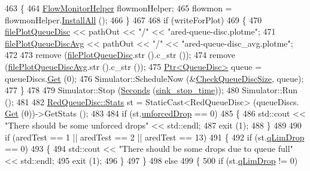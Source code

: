 \begin{DoxyCode}
463     \{
464       \hyperlink{classns3_1_1FlowMonitorHelper}{FlowMonitorHelper} flowmonHelper;
465       flowmon = flowmonHelper.\hyperlink{classns3_1_1FlowMonitorHelper_a722b383a10c5a959576f3bfee8d4374f}{InstallAll} ();
466     \}
467 
468   \textcolor{keywordflow}{if} (writeForPlot)
469     \{
470       \hyperlink{adaptive-red-tests_8cc_a06d9ff5c07ecb984ef94ad415abd87b5}{filePlotQueueDisc} << pathOut << \textcolor{stringliteral}{"/"} << \textcolor{stringliteral}{"ared-queue-disc.plotme"};
471       \hyperlink{adaptive-red-tests_8cc_a4164ee3b210acca3b1e1c45ad2bac980}{filePlotQueueDiscAvg} << pathOut << \textcolor{stringliteral}{"/"} << \textcolor{stringliteral}{"ared-queue-disc\_avg.plotme"};
472 
473       \textcolor{keyword}{remove} (\hyperlink{adaptive-red-tests_8cc_a06d9ff5c07ecb984ef94ad415abd87b5}{filePlotQueueDisc}.str ().c\_str ());
474       \textcolor{keyword}{remove} (\hyperlink{adaptive-red-tests_8cc_a4164ee3b210acca3b1e1c45ad2bac980}{filePlotQueueDiscAvg}.str ().c\_str ());
475       \hyperlink{classns3_1_1Ptr}{Ptr<QueueDisc>} queue = queueDiscs.\hyperlink{classns3_1_1QueueDiscContainer_a236064f6321b5f0d32561bb2a14e74af}{Get} (0);
476       Simulator::ScheduleNow (&\hyperlink{adaptive-red-tests_8cc_a64451d920062e967d2c0fa8b6ae85911}{CheckQueueDiscSize}, queue);
477     \}
478 
479   Simulator::Stop (\hyperlink{group__timecivil_ga33c34b816f8ff6628e33d5c8e9713b9e}{Seconds} (\hyperlink{adaptive-red-tests_8cc_a2462eef540f5b896f14d4ea7b7bb6214}{sink\_stop\_time}));
480   Simulator::Run ();
481 
482   \hyperlink{structns3_1_1RedQueueDisc_1_1Stats}{RedQueueDisc::Stats} st = StaticCast<RedQueueDisc> (queueDiscs.
      \hyperlink{classns3_1_1QueueDiscContainer_a236064f6321b5f0d32561bb2a14e74af}{Get} (0))->GetStats ();
483 
484   \textcolor{keywordflow}{if} (st.\hyperlink{structns3_1_1RedQueueDisc_1_1Stats_a242027f6eb7d30e2cd636c52080e2c73}{unforcedDrop} == 0)
485     \{
486       std::cout << \textcolor{stringliteral}{"There should be some unforced drops"} << std::endl;
487       exit (1);
488     \}
489 
490   \textcolor{keywordflow}{if} (aredTest == 1 || aredTest == 2 || aredTest == 13)
491     \{
492       \textcolor{keywordflow}{if} (st.\hyperlink{structns3_1_1RedQueueDisc_1_1Stats_a2374b8b8386ad6e42435bf1b29109bad}{qLimDrop} == 0)
493         \{
494           std::cout << \textcolor{stringliteral}{"There should be some drops due to queue full"} << std::endl;
495           exit (1);
496         \}
497     \}
498   \textcolor{keywordflow}{else}
499     \{
500       \textcolor{keywordflow}{if} (st.\hyperlink{structns3_1_1RedQueueDisc_1_1Stats_a2374b8b8386ad6e42435bf1b29109bad}{qLimDrop} != 0)

\end{DoxyCode}
